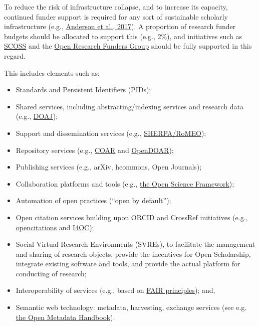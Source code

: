 To reduce the risk of infrastructure collapse, and to increase its
capacity, continued funder support is required for any sort of
sustainable scholarly infrastructure (e.g.,
\href{https://doi.org/10.1101/110825}{Anderson et al., 2017}). A
proportion of research funder budgets should be allocated to support
this (e.g., 2\%), and initiatives such as
\href{http://scoss.org/}{SCOSS} and the \href{http://www.orfg.org}{Open
Research Funders Group} should be fully supported in this regard.

This includes elements such as:

\begin{itemize}
\item
  Standards and Persistent Identifiers (PIDs);
\item
  Shared services, including abstracting/indexing services and research
  data (e.g., \href{https://doaj.org/}{DOAJ});
\item
  Support and dissemination services (e.g.,
  \href{http://www.sherpa.ac.uk/romeo/index.php}{SHERPA/RoMEO});
\item
  Repository services (e.g.,
  \href{https://www.coar-repositories.org/}{COAR} and
  \href{https://v2.sherpa.ac.uk/opendoar/}{OpenDOAR});
\item
  Publishing services (e.g., arXiv, hcommons, Open Journals);
\item
  Collaboration platforms and tools (e.g., \href{https://osf.io/}{the
  Open Science Framework});
\item
  Automation of open practices (``open by default'');
\item
  Open citation services building upon ORCID and CrossRef initiatives
  (e.g., \href{http://opencitations.net/}{opencitations} and
  \href{https://i4oc.org/}{I4OC});
\item
  Social Virtual Research Environments (SVREs), to facilitate the
  management and sharing of research objects, provide the incentives for
  Open Scholarship, integrate existing software and tools, and provide
  the actual platform for conducting of research;
\item
  Interoperability of services (e.g., based on
  \href{https://www.nature.com/articles/sdata201618}{FAIR principles});
  and,
\item
  Semantic web technology: metadata, harvesting, exchange services (see
  e.g. \href{https://en.wikibooks.org/wiki/Open_Metadata_Handbook}{the
  Open Metadata Handbook}).
\end{itemize}

